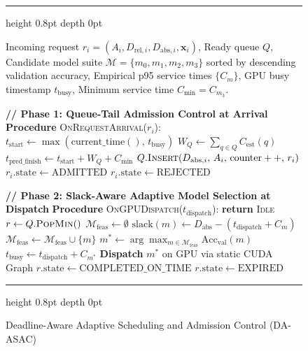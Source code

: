 \documentclass[conference]{IEEEtran}
\makeatletter
\newcounter{algorithm}
\newenvironment{algorithm}[1][tbp]{%
  \begin{figure}[#1]%
  \def\@captype{algorithm}%
  \vspace{-2pt}%
  \hrule height 0.8pt depth 0pt \kern 3pt
}{%
  \kern 3pt \hrule height 0.8pt depth 0pt
  \vspace{-2pt}%
  \end{figure}%
}
\newcommand{\STATEx}{\item[]}
\makeatother
\begin{document}
\begin{algorithm}[t]
\caption{Deadline-Aware Adaptive Scheduling and Admission Control (DA-ASAC)}
\label{alg:da_asac}
\begin{algorithmic}[1]\small
\REQUIRE Incoming request $r_i = (A_i, D_{\text{rel}, i}, D_{\text{abs}, i}, \mathbf{x}_i)$, Ready queue $Q$, Candidate model suite $\mathcal{M} = \{m_0, m_1, m_2, m_3\}$ sorted by descending validation accuracy, Empirical p95 service times $\{C_m\}$, GPU busy timestamp $t_{\text{busy}}$, Minimum service time $C_{\min} = C_{m_3}$.
\STATEx \textbf{// Phase 1: Queue-Tail Admission Control at Arrival}
\STATE \textbf{Procedure} \textsc{OnRequestArrival}($r_i$):
\STATE \quad $t_{\text{start}} \leftarrow \max(\text{current\_time}(), \, t_{\text{busy}})$
\STATE \quad $W_Q \leftarrow \sum_{q \in Q} C_{\text{est}}(q)$ 
\STATE \quad $t_{\text{pred\_finish}} \leftarrow t_{\text{start}} + W_Q + C_{\min}$
    \STATE $Q.\textsc{Insert}(D_{\text{abs}, i}, \, A_i, \, \text{counter}++, \, r_i)$ 
    \STATE $r_i.\text{state} \leftarrow \text{ADMITTED}$
\ELSE
    \STATE $r_i.\text{state} \leftarrow \text{REJECTED}$ 
\ENDIF
\STATEx \textbf{// Phase 2: Slack-Aware Adaptive Model Selection at Dispatch}
\STATE \textbf{Procedure} \textsc{OnGPUDispatch}($t_{\text{dispatch}}$):
    \STATE \textbf{return} \textsc{Idle}
\ENDIF
\STATE $r \leftarrow Q.\textsc{PopMin}()$ 
\STATE $\mathcal{M}_{\text{feas}} \leftarrow \emptyset$
    \STATE $\text{slack}(m) \leftarrow D_{\text{abs}} - (t_{\text{dispatch}} + C_m)$
        \STATE $\mathcal{M}_{\text{feas}} \leftarrow \mathcal{M}_{\text{feas}} \cup \{m\}$
    \ENDIF
\ENDFOR
{}
    \STATE $m^* \leftarrow \arg\max_{m \in \mathcal{M}_{\text{feas}}} \text{Acc}_{\text{val}}(m)$ 
    \STATE $t_{\text{busy}} \leftarrow t_{\text{dispatch}} + C_{m^*}$
    \STATE \textbf{Dispatch} $m^*$ on GPU via static CUDA Graph
    \STATE $r.\text{state} \leftarrow \text{COMPLETED\_ON\_TIME}$
\ELSE
    \STATE $r.\text{state} \leftarrow \text{EXPIRED}$ 
\ENDIF
\end{algorithmic}
\end{algorithm}
\end{document}
